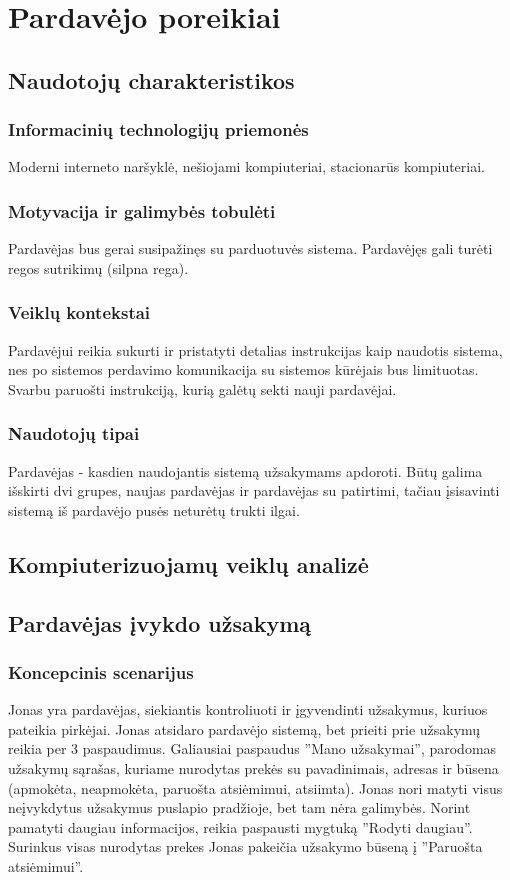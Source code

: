 \documentclass[oneside]{VUMIFPSkursinis}
\begin{document}
\section{Pardavėjo poreikiai}
	\subsection{Naudotojų charakteristikos}
		\subsubsection{Informacinių technologijų priemonės}
			Moderni interneto naršyklė, nešiojami kompiuteriai, stacionarūs kompiuteriai.
		\subsubsection{Motyvacija ir galimybės tobulėti}
			Pardavėjas bus gerai susipažinęs su parduotuvės sistema. Pardavėjęs gali turėti regos sutrikimų (silpna rega).
		\subsubsection{Veiklų kontekstai}
			Pardavėjui reikia sukurti ir pristatyti detalias instrukcijas kaip naudotis sistema, nes po sistemos perdavimo komunikacija su sistemos kūrėjais bus limituotas. Svarbu paruošti instrukciją, kurią galėtų sekti nauji pardavėjai.
		\subsubsection{Naudotojų tipai}
			Pardavėjas - kasdien naudojantis sistemą užsakymams apdoroti.
			Būtų galima išskirti dvi grupes, naujas pardavėjas ir pardavėjas su patirtimi, tačiau įsisavinti sistemą iš pardavėjo pusės neturėtų trukti ilgai.
	\subsection{Kompiuterizuojamų veiklų analizė}

	\subsection{Pardavėjas įvykdo užsakymą}
		\subsubsection{Koncepcinis scenarijus}
			Jonas yra pardavėjas, siekiantis kontroliuoti ir įgyvendinti užsakymus, kuriuos pateikia pirkėjai. Jonas atsidaro pardavėjo sistemą, bet prieiti prie užsakymų reikia per 3 paspaudimus. Galiausiai paspaudus ''Mano užsakymai'', parodomas užsakymų sąrašas, kuriame nurodytas prekės su pavadinimais, adresas ir būsena (apmokėta, neapmokėta, paruošta atsiėmimui, atsiimta). Jonas nori matyti visus neįvykdytus užsakymus puslapio pradžioje, bet tam nėra galimybės. Norint pamatyti daugiau informacijos, reikia paspausti mygtuką ''Rodyti daugiau''.  Surinkus visas nurodytas prekes Jonas pakeičia užsakymo būseną į ''Paruošta atsiėmimui''.
\end{document}
